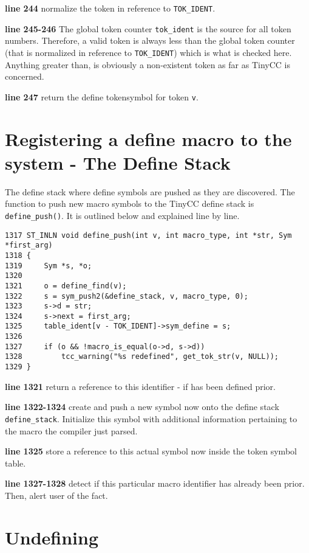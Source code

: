 \begin{tcc_desc}
\textbf{line 244} normalize the token in reference to \verb|TOK_IDENT|.

\textbf{line 245-246} The global token counter \verb|tok_ident| is the source for all token numbers. Therefore, a valid token is always less than the global token counter (that is normalized in reference to \verb|TOK_IDENT|) which is what is checked here. Anything greater than, is obviously a non-existent token as far as TinyCC is concerned.

\textbf{line 247} return the define tokensymbol for token \verb|v|.
\end{tcc_desc}


\section{Registering a define macro to the system - The Define Stack}
The define stack where define symbols are pushed as they are discovered. The function to push new macro symbols to the TinyCC define stack is \verb|define_push()|. It is outlined below and explained line by line.

\begin{verbatim}
1317 ST_INLN void define_push(int v, int macro_type, int *str, Sym *first_arg)
1318 {
1319     Sym *s, *o;
1320
1321     o = define_find(v);
1322     s = sym_push2(&define_stack, v, macro_type, 0);
1323     s->d = str;
1324     s->next = first_arg;
1325     table_ident[v - TOK_IDENT]->sym_define = s;
1326
1327     if (o && !macro_is_equal(o->d, s->d))
1328         tcc_warning("%s redefined", get_tok_str(v, NULL));
1329 }
\end{verbatim}

\begin{tcc_desc}
\textbf{line 1321} return a reference to this identifier - if has been defined prior.

\textbf{line 1322-1324} create and push a new symbol now onto the define stack \verb|define_stack|. Initialize this symbol with additional information pertaining to the macro the compiler just parsed.

\textbf{line 1325} store a reference to this actual symbol now inside the token symbol table.

\textbf{line 1327-1328} detect if this particular macro identifier has already been prior. Then, alert user of the fact.
\end{tcc_desc}

\section{Undefining}

